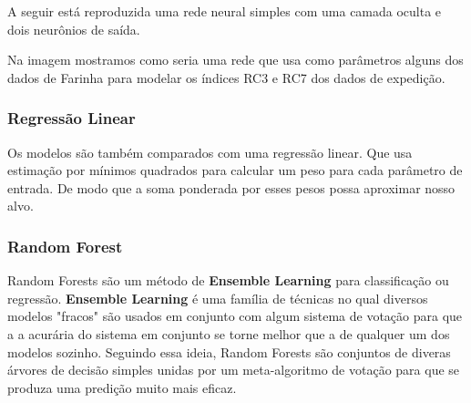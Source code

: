 A seguir está reproduzida uma rede neural simples com uma camada oculta e dois neurônios de saída.


%


Na imagem mostramos como seria uma rede que usa como parâmetros alguns dos dados de Farinha para modelar os índices RC3 e RC7 dos dados de expedição.

\bigskip
\subsubsection{Regressão Linear}
Os modelos são também comparados com uma regressão linear. Que usa estimação por mínimos quadrados para calcular um peso para cada parâmetro de entrada. De modo que a soma ponderada por esses pesos possa aproximar nosso alvo.


\subsubsection{Random Forest}

Random Forests são um método de \textbf{Ensemble Learning} para classificação ou regressão. \textbf{Ensemble Learning} é uma família de técnicas no qual diversos modelos "fracos" são usados em conjunto com algum sistema de votação para que a a acurária do sistema em conjunto se torne melhor que a de qualquer um dos modelos sozinho. Seguindo essa ideia, Random Forests são conjuntos de diveras árvores de decisão simples unidas por um meta-algoritmo de votação para que se produza uma predição muito mais eficaz.




